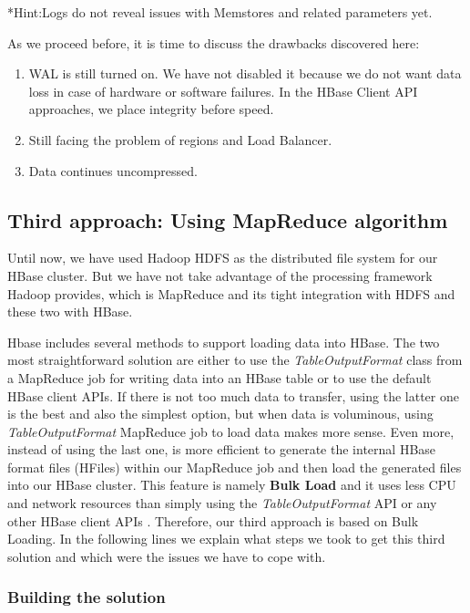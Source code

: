 *Hint:Logs do not reveal issues with Memstores and related parameters yet.

\bigskip

As we proceed before, it is time to discuss the drawbacks discovered here:
\begin{enumerate}
\item WAL is still turned on. We have not disabled it because we do not want data loss in case of hardware or software failures. In the HBase Client API approaches, we place integrity before speed.

\item Still facing the problem of regions and Load Balancer.

\item Data continues uncompressed.
\end{enumerate}


\subsection{Third approach: Using MapReduce algorithm}


Until now, we have used Hadoop HDFS as the distributed file system for our HBase cluster. But we have not take advantage of the processing framework Hadoop provides, which is MapReduce and its tight integration with HDFS and these two with HBase.
\par
Hbase includes several methods to support loading data into HBase. The two most straightforward solution are either to use the \textit{TableOutputFormat} class from a MapReduce job for writing data into an HBase table or to use the default HBase client APIs. If there is not too much data to transfer, using the latter one is the best and also the simplest option, but when data is voluminous, using \textit{TableOutputFormat} MapReduce job to load data makes more sense. Even more, instead of using the last one, is more efficient to generate the internal HBase format files (HFiles) within our MapReduce job and then load the generated files into our HBase cluster. This feature is namely \textbf{Bulk Load} and it uses less CPU and network resources than simply using the \textit{TableOutputFormat} API or any other HBase client APIs \cite{ApacheHBaseBulkLoad}. Therefore, our third approach is based on Bulk Loading. In the following lines we explain what steps we took to get this third solution and which were the issues we have to cope with.

\subsubsection{Building the solution}

